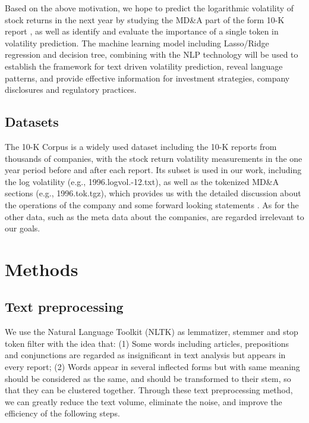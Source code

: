 \documentclass[11pt]{article}
\begin{document}
Based on the above motivation, we hope to predict the logarithmic volatility of stock returns in the next year by studying the MD\&A part of the form 10-K report \cite{MATTERA20241539}\cite{ma2023stock}, as well as identify and evaluate the importance of a single token in volatility prediction. The machine learning model including Lasso/Ridge regression and decision tree, combining with the NLP technology \cite{yogatama2015sparse} will be used to establish the framework for text driven volatility prediction, reveal language patterns, and provide effective information for investment strategies, company disclosures and regulatory practices.

\subsection{Datasets}

The 10-K Corpus \cite{kogan2009predicting} is a widely used dataset including the 10-K reports from thousands of companies, with the stock return volatility measurements in the one year period before and after each report. Its subset is used in our work, including the log volatility (e.g., 1996.logvol.-12.txt), as well as the tokenized MD\&A sections (e.g., 1996.tok.tgz), which provides us with the detailed discussion about the operations of the company and some forward looking statements \cite{brown2024financial}. As for the other data, such as the meta data about the companies, are regarded irrelevant to our goals.

\section{Methods}

\subsection{Text preprocessing}

We use the Natural Language Toolkit (NLTK) \cite{nltk-py} as lemmatizer, stemmer and stop token filter with the idea that: (1) Some words including articles, prepositions and conjunctions are regarded as insignificant in text analysis but appears in every report; (2) Words appear in several inflected forms but with same meaning should be considered as the same, and should be transformed to their stem, so that they can be clustered together. Through these text preprocessing method, we can greatly reduce the text volume, eliminate the noise, and improve the efficiency of the following steps.
\end{document}
